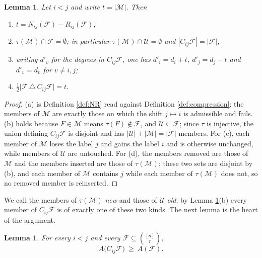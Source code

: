 \documentclass[11pt,reqno]{amsart}
\theoremstyle{plain}
\newtheorem{lemma}[theorem]{Lemma}
\theoremstyle{definition}
\newcommand{\F}{\mathcal{F}}
\newcommand{\Uu}{\mathcal{U}}
\newcommand{\M}{\mathcal{M}}
\begin{document}
\begin{lemma}\label{lem:basic}
Let $i<j$ and write $t=|\M|$. Then
\begin{enumerate}
\item[(a)] $t=N_{ij}(\F)-R_{ij}(\F)$;
\item[(b)] $\tau(\M)\cap\F=\emptyset$; in particular $\tau(\M)\cap\Uu=\emptyset$ and
$|C_{ij}\F|=|\F|$;
\item[(c)] writing $d'_v$ for the degrees in $C_{ij}\F$, one has $d'_i=d_i+t$, $d'_j=d_j-t$ and
$d'_v=d_v$ for $v\ne i,j$;
\item[(d)] $\tfrac12\bigl|\F\,\triangle\,C_{ij}\F\bigr|=t$.
\end{enumerate}
\end{lemma}

\begin{proof}
(a) is Definition \ref{def:NR} read against Definition \ref{def:compression}: the members of $\M$
are exactly those on which the shift $j\mapsto i$ is admissible and fails. (b) holds because
$F\in\M$ means $\tau(F)\notin\F$, and $\Uu\subseteq\F$; since $\tau$ is injective, the union
defining $C_{ij}\F$ is disjoint and has $|\Uu|+|\M|=|\F|$ members. For (c), each member of $\M$
loses the label $j$ and gains the label $i$ and is otherwise unchanged, while members of $\Uu$ are
untouched. For (d), the members removed are those of $\M$ and the members inserted are those of
$\tau(\M)$; these two sets are disjoint by (b), and each member of $\M$ contains $j$ while each
member of $\tau(\M)$ does not, so no removed member is reinserted.
\end{proof}

We call the members of $\tau(\M)$ \emph{new} and those of $\Uu$ \emph{old}; by Lemma
\ref{lem:basic}(b) every member of $C_{ij}\F$ is of exactly one of these two kinds. The next lemma
is the heart of the argument.

\begin{lemma}\label{lem:Amonotone}
For every $i<j$ and every $\F\subseteq\binom{[n]}{r}$,
\[
A\bigl(C_{ij}\F\bigr)\ \ge\ A(\F).
\]
\end{lemma}
\end{document}
